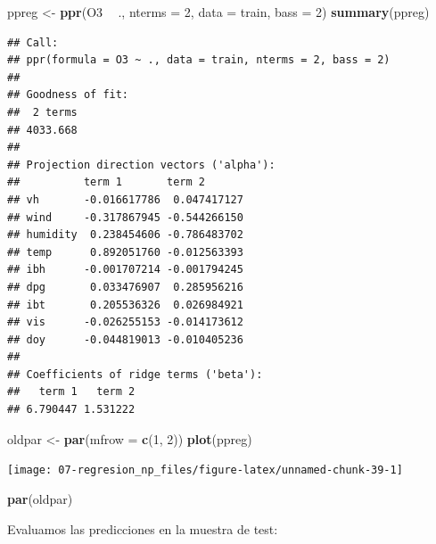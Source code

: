\documentclass[
]{book}
\newenvironment{Shaded}{\begin{snugshade}}{\end{snugshade}}
\newcommand{\DataTypeTok}[1]{\textcolor[rgb]{0.13,0.29,0.53}{#1}}
\newcommand{\DecValTok}[1]{\textcolor[rgb]{0.00,0.00,0.81}{#1}}
\newcommand{\KeywordTok}[1]{\textcolor[rgb]{0.13,0.29,0.53}{\textbf{#1}}}
\newcommand{\NormalTok}[1]{#1}
\newcommand{\OperatorTok}[1]{\textcolor[rgb]{0.81,0.36,0.00}{\textbf{#1}}}
\newcommand{\StringTok}[1]{\textcolor[rgb]{0.31,0.60,0.02}{#1}}
\theoremstyle{break}
\theoremstyle{definition}
\theoremstyle{definition}
\theoremstyle{definition}
\theoremstyle{remark}
\begin{document}
\begin{Shaded}
\begin{Highlighting}[]
\NormalTok{ppreg <-}\StringTok{ }\KeywordTok{ppr}\NormalTok{(O3 }\OperatorTok{~}\StringTok{ }\NormalTok{., }\DataTypeTok{nterms =} \DecValTok{2}\NormalTok{, }\DataTypeTok{data =}\NormalTok{ train, }\DataTypeTok{bass =} \DecValTok{2}\NormalTok{)}
\KeywordTok{summary}\NormalTok{(ppreg)}
\end{Highlighting}
\end{Shaded}

\begin{verbatim}
## Call:
## ppr(formula = O3 ~ ., data = train, nterms = 2, bass = 2)
## 
## Goodness of fit:
##  2 terms 
## 4033.668 
## 
## Projection direction vectors ('alpha'):
##          term 1       term 2      
## vh       -0.016617786  0.047417127
## wind     -0.317867945 -0.544266150
## humidity  0.238454606 -0.786483702
## temp      0.892051760 -0.012563393
## ibh      -0.001707214 -0.001794245
## dpg       0.033476907  0.285956216
## ibt       0.205536326  0.026984921
## vis      -0.026255153 -0.014173612
## doy      -0.044819013 -0.010405236
## 
## Coefficients of ridge terms ('beta'):
##   term 1   term 2 
## 6.790447 1.531222
\end{verbatim}

\begin{Shaded}
\begin{Highlighting}[]
\NormalTok{oldpar <-}\StringTok{ }\KeywordTok{par}\NormalTok{(}\DataTypeTok{mfrow =} \KeywordTok{c}\NormalTok{(}\DecValTok{1}\NormalTok{, }\DecValTok{2}\NormalTok{))}
\KeywordTok{plot}\NormalTok{(ppreg)}
\end{Highlighting}
\end{Shaded}

\begin{center}\texttt{[image: 07-regresion\_np\_files/figure-latex/unnamed-chunk-39-1]} \end{center}

\begin{Shaded}
\begin{Highlighting}[]
\KeywordTok{par}\NormalTok{(oldpar)}
\end{Highlighting}
\end{Shaded}

Evaluamos las predicciones en la muestra de test:

\begin{Shaded}
\end{Shaded}
\end{document}
